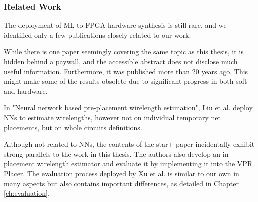 \subsubsection{Related Work}

The deployment of \gls{ML} to \gls{FPGA} hardware synthesis is still rare\cite{routability-estimator}, and we identified only a few publications closely related to our work. 

While there is one paper seemingly covering the same topic as this thesis, it is hidden behind a paywall, and the accessible abstract does not disclose much useful information\cite{doi:10.1142/S0218213098000202}. Furthermore, it was published more than 20 years ago. This might make some of the results obsolete due to significant progress in both soft- and hardware.

In "Neural network based pre-placement wirelength estimation"\cite{pre-placement-estimation}, Liu et al. deploy \glspl{NN} to estimate wirelengths, however not on individual temporary net placements, but on whole circuits definitions.

Although not related to \glspl{NN}, the contents of the star+ paper incidentally exhibit strong parallels to the work in this thesis. The authors also develop an in-placement wirelength estimator and evaluate it by implementing it into the \gls{VPR} Placer. The evaluation process deployed by Xu et al. is similar to our own in many aspects but also contains important differences, as detailed in Chapter \ref{ch:evaluation}.
